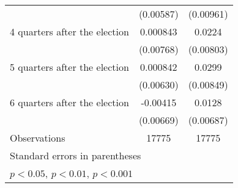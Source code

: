 \begin{table}[htbp]
\begin{tabular}{l*{2}{c}}
                    &   (0.00587)         &   (0.00961)         \\
[1em]
 4 quarters after the election&    0.000843         &      0.0224\sym{**} \\
                    &   (0.00768)         &   (0.00803)         \\
[1em]
 5 quarters after the election&    0.000842         &      0.0299\sym{***}\\
                    &   (0.00630)         &   (0.00849)         \\
[1em]
 6 quarters after the election&    -0.00415         &      0.0128         \\
                    &   (0.00669)         &   (0.00687)         \\
\hline
Observations        &       17775         &       17775         \\
\hline\hline
\multicolumn{3}{l}{\footnotesize Standard errors in parentheses}\\
\multicolumn{3}{l}{\footnotesize \sym{*} \(p<0.05\), \sym{**} \(p<0.01\), \sym{***} \(p<0.001\)}\\
\end{tabular}
\end{table}
